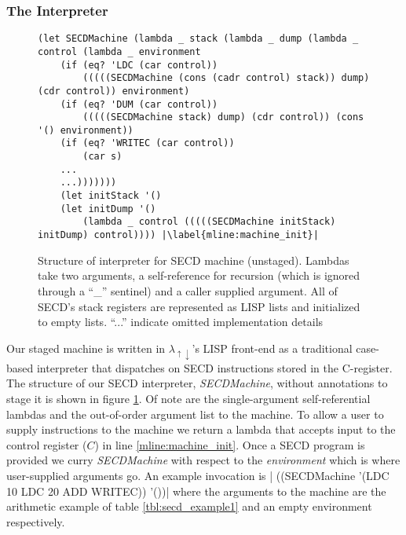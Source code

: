 \documentclass[a4paper,12pt,twoside,openright]{report}
\theoremstyle{definition}
\newcommand{\mslang}{$\lambda_{\uparrow\downarrow}$}
\begin{document}

\newpage
\subsubsection{The Interpreter}\label{subsec:secd_interp}
\begin{figure}[htp!]
\centering
\begin{verbatim}
(let SECDMachine (lambda _ stack (lambda _ dump (lambda _ control (lambda _ environment
    (if (eq? 'LDC (car control))
        (((((SECDMachine (cons (cadr control) stack)) dump) (cdr control)) environment)
    (if (eq? 'DUM (car control))
        (((((SECDMachine stack) dump) (cdr control)) (cons '() environment))
    (if (eq? 'WRITEC (car control))
        (car s)
    ...
    ...)))))))
    (let initStack '()
    (let initDump '()
        (lambda _ control (((((SECDMachine initStack) initDump) control)))) |\label{mline:machine_init}|
\end{verbatim}
\caption{Structure of interpreter for SECD machine (unstaged). Lambdas take two arguments, a self-reference for recursion (which is ignored through a ``\_'' sentinel) and a caller supplied argument. All of SECD's stack registers are represented as LISP lists and initialized to empty lists. ``...'' indicate omitted implementation details}
\label{lst:secd_unstaged}
\end{figure}

Our staged machine is written in \mslang's LISP front-end as a traditional case-based interpreter that dispatches on SECD instructions stored in the C-register. The structure of our SECD interpreter, \textit{SECDMachine}, without annotations to stage it is shown in figure \ref{lst:secd_unstaged}. Of note are the single-argument self-referential lambdas and the out-of-order argument list to the machine. To allow a user to supply instructions to the machine we return a lambda that accepts input to the control register ($C$) in line \ref{mline:machine_init}. Once a SECD program is provided we curry \textit{SECDMachine} with respect to the \textit{environment} which is where user-supplied arguments go. An example invocation is |  ((SECDMachine '(LDC 10 LDC 20 ADD WRITEC)) '())| where the arguments to the machine are the arithmetic example of table \ref{tbl:secd_example1} and an empty environment respectively.
\end{document}
